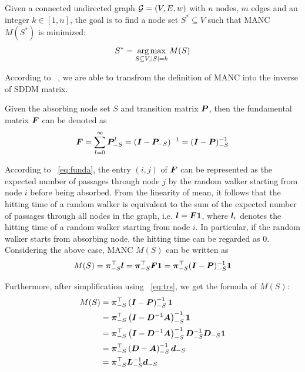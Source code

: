 \documentclass[sigconf]{acmart}
\begin{document}
\begin{problem}
Given a connected undirected graph \(\mathcal{G}=(V,E,w)\) with \(n\) nodes, \(m\) edges and an integer \(k\in[1,n]\), the goal is to find a node set \(S^*\subseteq V\) such that MANC \(M(S^*)\) is minimized:
\[S^*=\operatorname*{arg\,max}_{S\subseteq V,\left|S \right|=k}M(S)\]
\end{problem}

According to ~\cite{KeSn76}, we are able to transfrom the definition of MANC into the inverse of SDDM matrix.

\begin{fact}
    Given the absorbing node set \(S\) and transition matrix \(\boldsymbol{P}\), then the fundamental matrix \(\boldsymbol{F}\) can be denoted as
    \begin{equation}\label{eq:funda}
        \boldsymbol{F}=\sum_{l=0}^\infty\boldsymbol{P}_{-S}^l=(\boldsymbol{I}-\boldsymbol{P}_{-S})^{-1}=(\boldsymbol{I}-\boldsymbol{P})_{-S}^{-1}
    \end{equation}
\end{fact}

According to ~\eqref{eq:funda}, the entry \((i,j)\) of \(\boldsymbol{F}\) can be represented as the expected number of passages through node \(j\) by the random walker starting from node \(i\) before being absorbed.
From the linearity of mean, it follows that the hitting time of a random walker is equivalent to the sum of the expected number of passages through all nodes in the graph, i.e. \(\boldsymbol{l}=\boldsymbol{F}\boldsymbol{1}\), where \(\boldsymbol{l}_i\) denotes the hitting time of a random walker starting from node \(i\).
In particular, if the random walker starts from absorbing node, the hitting time can be regarded as \(0\). Considering the above case, MANC \(M(S)\) can be written as
\[M(S)=\boldsymbol{\pi}_{-S}^\top\boldsymbol{l}=\boldsymbol{\pi}_{-S}^\top\boldsymbol{F}\boldsymbol{1}=\boldsymbol{\pi}_{-S}^\top(\boldsymbol{I}-\boldsymbol{P})_{-S}^{-1}\boldsymbol{1}\]

Furthermore, after simplification using ~\eqref{eq:trs}, we get the formula of \(M(S)\):
\begin{equation}\label{eq:MANC}
    \begin{split}
        M(S) & =\boldsymbol{\pi}_{-S}^\top\left(\boldsymbol{I}-\boldsymbol{P}\right)_{-S}^{-1}\boldsymbol{1}                                    \\
        & =\boldsymbol{\pi}_{-S}^\top\left(\boldsymbol{I}-\boldsymbol{D}^{-1}\boldsymbol{A}\right)_{-S}^{-1}\boldsymbol{1}                          \\
        & =\boldsymbol{\pi}_{-S}^\top\left(\boldsymbol{I}-\boldsymbol{D}^{-1}\boldsymbol{A}\right)_{-S}^{-1}\boldsymbol{D}_{-S}^{-1}\boldsymbol{D}_{-S}\boldsymbol{1} \\
        & =\boldsymbol{\pi}_{-S}^\top\left(\boldsymbol{D}-\boldsymbol{A}\right)_{-S}^{-1}\boldsymbol{d}_{-S}                                \\
        & =\boldsymbol{\pi}_{-S}^\top\boldsymbol{L}_{-S}^{-1}\boldsymbol{d}_{-S}
    \end{split}
\end{equation}
\end{document}
